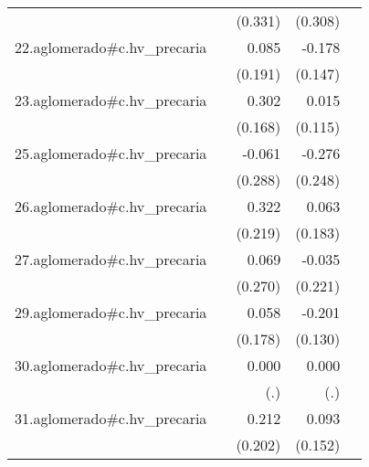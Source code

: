 {\begin{longtable}{l*{4}{D{.}{.}{-1}}}
            &                     &     (0.331)         &     (0.308)         &                     \\
\addlinespace
22.aglomerado#c.hv\_precaria&                     &       0.085         &      -0.178         &                     \\
            &                     &     (0.191)         &     (0.147)         &                     \\
\addlinespace
23.aglomerado#c.hv\_precaria&                     &       0.302         &       0.015         &                     \\
            &                     &     (0.168)         &     (0.115)         &                     \\
\addlinespace
25.aglomerado#c.hv\_precaria&                     &      -0.061         &      -0.276         &                     \\
            &                     &     (0.288)         &     (0.248)         &                     \\
\addlinespace
26.aglomerado#c.hv\_precaria&                     &       0.322         &       0.063         &                     \\
            &                     &     (0.219)         &     (0.183)         &                     \\
\addlinespace
27.aglomerado#c.hv\_precaria&                     &       0.069         &      -0.035         &                     \\
            &                     &     (0.270)         &     (0.221)         &                     \\
\addlinespace
29.aglomerado#c.hv\_precaria&                     &       0.058         &      -0.201         &                     \\
            &                     &     (0.178)         &     (0.130)         &                     \\
\addlinespace
30.aglomerado#c.hv\_precaria&                     &       0.000         &       0.000         &                     \\
            &                     &         (.)         &         (.)         &                     \\
\addlinespace
31.aglomerado#c.hv\_precaria&                     &       0.212         &       0.093         &                     \\
            &                     &     (0.202)         &     (0.152)         &                     \\

\end{longtable}}
